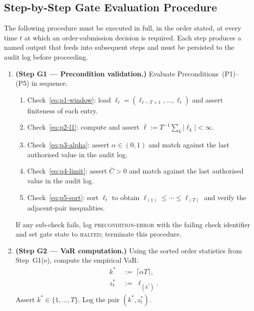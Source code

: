 \documentclass[12pt,openany]{book}
\numberwithin{equation}{chapter}
\theoremstyle{plain}
\theoremstyle{definition}
\theoremstyle{remark}
\numberwithin{equation}{chapter}
\theoremstyle{plain}
\begin{document}
\subsection{Step-by-Step Gate Evaluation Procedure}
\label{ssec:gate-procedure}

The following procedure must be executed in full, in the order
stated, at every time $t$ at which an order-submission decision is
required.  Each step produces a named output that feeds into
subsequent steps and must be persisted to the audit log before
proceeding.

\begin{enumerate}
  \item \textbf{(Step G1 --- Precondition validation.)}
        Evaluate Preconditions~(P1)--(P5) in sequence.
        \begin{enumerate}
          \item Check~\eqref{eq:p1-window}: load
                $\boldsymbol{\ell}_t = (\ell_{t-T+1},\ldots,\ell_t)$
                and assert finiteness of each entry.
          \item Check~\eqref{eq:p2-l1}: compute and assert
                $\bar{\ell} := T^{-1}\sum_{k}|\ell_k| < \infty$.
          \item Check~\eqref{eq:p3-alpha}: assert
                $\alpha \in (0,1)$ and match against the
                last authorised value in the audit log.
          \item Check~\eqref{eq:p4-limit}: assert
                $\bar{C} > 0$ and match against the
                last authorised value in the audit log.
          \item Check~\eqref{eq:p5-sort}: sort
                $\boldsymbol{\ell}_t$ to obtain
                $\ell_{(1)}\leq\cdots\leq\ell_{(T)}$
                and verify the adjacent-pair inequalities.
        \end{enumerate}
        If any sub-check fails, log \textsc{precondition-error}
        with the failing check identifier and set gate state to
        \textsc{halted}; terminate this procedure.

  \item \textbf{(Step G2 --- VaR computation.)}
        Using the sorted order statistics from Step~G1(e),
        compute the empirical VaR:
        \begin{align}
          k^* \;&:=\; \lceil \alpha T \rceil,
            \label{eq:gate-kstar}\\
          z^*_t \;&:=\; \ell_{(k^*)}.
            \label{eq:gate-var}
        \end{align}
        Assert $k^* \in \{1,\ldots,T\}$.
        Log the pair $(k^*, z^*_t)$.


\end{enumerate}
\end{document}

